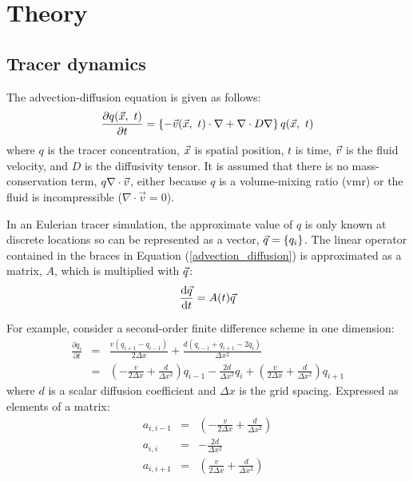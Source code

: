 \documentclass{article}
\begin{document}
\section{Theory}

\subsection{Tracer dynamics}

The advection-diffusion equation is given as follows:
\begin{equation}
\frac{\partial q(\vec x, ~ t)}{\partial t} = \left \lbrace -\vec v(\vec x, ~t) \cdot \nabla + \nabla \cdot D \nabla \right \rbrace q(\vec x, ~ t)
\label{advection_diffusion}
\end{equation}
where $q$ is the tracer concentration, $\vec x$ is spatial position, 
$t$ is time, $\vec v$ is the fluid velocity, and $D$ is the diffusivity tensor.
It is assumed that there is no mass-conservation term, $q \nabla \cdot \vec v$,
either because $q$ is a volume-mixing ratio (vmr) or 
the fluid is incompressible ($\nabla \cdot \vec v = 0$).

In an Eulerian tracer simulation, the approximate value of $q$
is only known at discrete locations so can be represented as a vector,
$\vec q=\lbrace q_i \rbrace$.
The linear operator contained in the braces in Equation 
(\ref{advection_diffusion}) is approximated as a matrix, $A$, which is 
multiplied with $\vec q$:
\begin{equation}
\frac{\mathrm d \vec q}{\mathrm d t} = A(t) \vec q
\label{linear_ODE}
\end{equation}

For example, consider a second-order finite difference scheme in one dimension:
\begin{eqnarray}
\frac{\partial q_i}{\partial t} & = & \frac{v(q_{i+1} - q_{i-1})}{2 \Delta x} +
	\frac{d (q_{i-1} + q_{i+1} - 2 q_i)}{\Delta x^2} \\
& = & \left (- \frac{v}{2 \Delta x} + \frac{d}{\Delta x^2} \right ) q_{i-1} -
	\frac{2 d}{\Delta x^2} q_i + 
	\left (\frac{v}{2 \Delta x} + \frac{d}{\Delta x^2} \right ) q_{i+1} \label{finite_difference_diffusion}
\end{eqnarray}
where $d$ is a scalar diffusion coefficient and $\Delta x$ is the grid spacing.
Expressed as elements of a matrix:
\begin{eqnarray}
a_{i,i-1} & = & \left (- \frac{v}{2 \Delta x} + \frac{d}{\Delta x^2} \right ) \\
	a_{i,i} & = & -\frac{2 d}{\Delta x^2} \\
a_{i,i+1} & = & \left (\frac{v}{2 \Delta x} + \frac{d}{\Delta x^2} \right )
\end{eqnarray}
\end{document}
